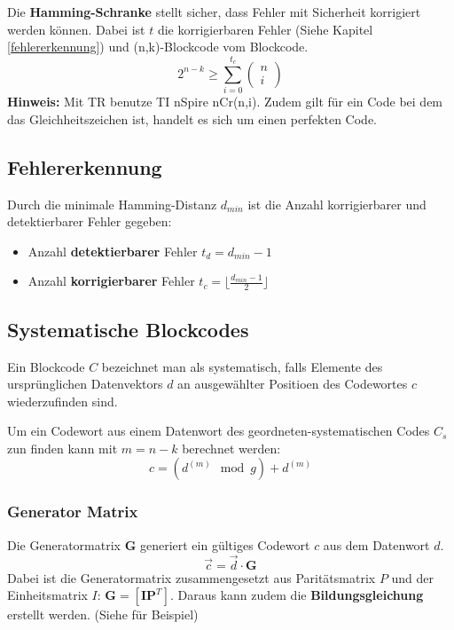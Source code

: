 \noindent Die \textbf{Hamming-Schranke}  stellt sicher, dass Fehler mit Sicherheit korrigiert werden können. Dabei ist $t$ die korrigierbaren Fehler (Siehe Kapitel \ref{fehlererkennung}) und (n,k)-Blockcode vom Blockcode.
\[
2^{n-k} \ge \sum_{i=0}^{t_c}\begin{pmatrix}n \\ i\end{pmatrix}
\]
\textbf{Hinweis:} Mit TR benutze TI nSpire nCr(n,i). Zudem gilt für ein Code bei dem das Gleichheitszeichen ist, handelt es sich um einen perfekten Code.

\subsection{Fehlererkennung}\label{fehlererkennung}
Durch die minimale Hamming-Distanz $d_{min}$ ist die Anzahl korrigierbarer und detektierbarer Fehler gegeben:
\begin{itemize}[nosep]
	\item Anzahl \textbf{detektierbarer} Fehler $t_d = d_{min} - 1$
	\item Anzahl \textbf{korrigierbarer} Fehler $t_c =\lfloor \frac{d_{min} - 1}{2}\rfloor$
\end{itemize}

\subsection{Systematische Blockcodes}
 Ein Blockcode $C$ bezeichnet man als systematisch, falls Elemente des ursprünglichen Datenvektors $d$ an ausgewählter Positioen des Codewortes $c$ wiederzufinden sind.

Um ein Codewort aus einem Datenwort des geordneten-systematischen Codes $C_s$ zun finden kann mit $m = n-k$ berechnet werden:
\[
c= (d^{(m)} \mod g) + d^{(m)}
\]

\subsubsection{Generator Matrix}
Die Generatormatrix $\mathbf{G}$ generiert ein gültiges Codewort $c$ aus dem Datenwort $d$.
\[
\vec{c} = \vec{d} \cdot \mathbf{G}
\]
Dabei ist die Generatormatrix zusammengesetzt aus Paritätsmatrix $P$ und der Einheitsmatrix $I$: $\mathbf{G} = [ \mathbf{I} \mathbf{P}^T ]$. Daraus kann zudem die \textbf{Bildungsgleichung} erstellt werden. (Siehe  für Beispiel)


